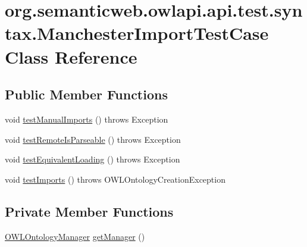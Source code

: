 \hypertarget{classorg_1_1semanticweb_1_1owlapi_1_1api_1_1test_1_1syntax_1_1_manchester_import_test_case}{\section{org.\-semanticweb.\-owlapi.\-api.\-test.\-syntax.\-Manchester\-Import\-Test\-Case Class Reference}
\label{classorg_1_1semanticweb_1_1owlapi_1_1api_1_1test_1_1syntax_1_1_manchester_import_test_case}
}
\subsection*{Public Member Functions}
\begin{DoxyCompactItemize}
\item 
void \hyperlink{classorg_1_1semanticweb_1_1owlapi_1_1api_1_1test_1_1syntax_1_1_manchester_import_test_case_a5738b4456ac59ca5ce7c23413e601cdb}{test\-Manual\-Imports} ()  throws Exception 
\item 
void \hyperlink{classorg_1_1semanticweb_1_1owlapi_1_1api_1_1test_1_1syntax_1_1_manchester_import_test_case_a9bef61b0954d32c1df57a5b937a77b59}{test\-Remote\-Is\-Parseable} ()  throws Exception 
\item 
void \hyperlink{classorg_1_1semanticweb_1_1owlapi_1_1api_1_1test_1_1syntax_1_1_manchester_import_test_case_aa6d5edbc9cd131b5db074f250f1e605e}{test\-Equivalent\-Loading} ()  throws Exception 
\item 
void \hyperlink{classorg_1_1semanticweb_1_1owlapi_1_1api_1_1test_1_1syntax_1_1_manchester_import_test_case_a3fb5738c92bd3600930574a44b9cc662}{test\-Imports} ()  throws O\-W\-L\-Ontology\-Creation\-Exception 
\end{DoxyCompactItemize}
\subsection*{Private Member Functions}
\begin{DoxyCompactItemize}
\item 
\hyperlink{interfaceorg_1_1semanticweb_1_1owlapi_1_1model_1_1_o_w_l_ontology_manager}{O\-W\-L\-Ontology\-Manager} \hyperlink{classorg_1_1semanticweb_1_1owlapi_1_1api_1_1test_1_1syntax_1_1_manchester_import_test_case_a534384e161ba891e72699034fbf6e31e}{get\-Manager} ()
\end{DoxyCompactItemize}
